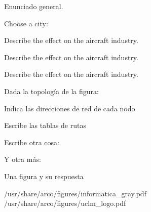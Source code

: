 \documentclass[english]{arco-exam}
\begin{document}
\begin{questions}
\begin{simpleQuestion}[1]
\end{simpleQuestion}


  \begin{multiQuestion}[12]
    Enunciado general.

    \begin{parts}
    \subQuestion[]
      Choose a city:


    \subQuestion[]
      Describe the effect on the aircraft industry.


    \subQuestion[]
      Describe the effect on the aircraft industry.


    \subQuestion[]
      Describe the effect on the aircraft industry.


    \end{parts}
  \end{multiQuestion}

  \begin{multiQuestion}[4]
    Dada la topología de la figura:

    \begin{parts}
      \subQuestion
      Indica las direcciones de red de cada nodo


      \subQuestion[1]
      Escribe las tablas de rutas


      \subQuestion
      Escribe otra cosa:


      \subQuestion
      Y otra más:

    \end{parts}

  \end{multiQuestion}


\begin{simpleQuestion}[5]
  Una figura y su respuesta

                     {/usr/share/arco/figures/informatica_gray.pdf}
                     {/usr/share/arco/figures/uclm_logo.pdf}
\end{simpleQuestion}


\end{questions}
\end{document}
